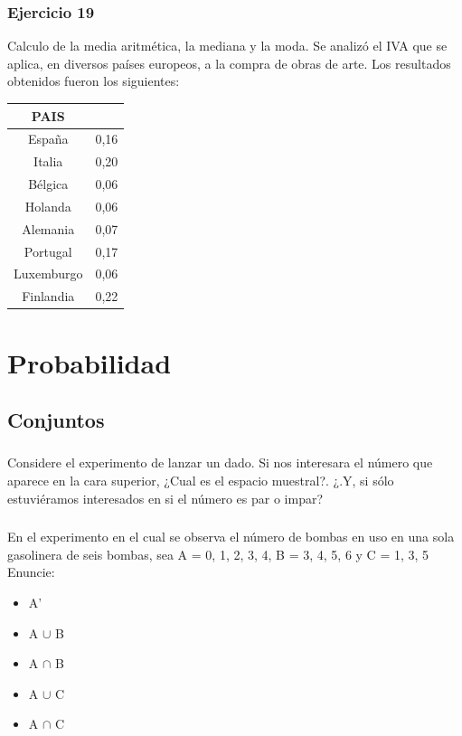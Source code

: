 \documentclass[11pt,letterpaper]{report}
\begin{document}
      \subsection*{Ejercicio 19}
        Calculo de la media aritmética, la mediana y la moda. Se analizó el IVA que se aplica, en diversos países europeos, a la compra de obras de arte. Los resultados obtenidos fueron los siguientes:
        \begin{table}[!h]
            \begin{tabular}{|c|c|}
                \hline
                PAIS& \\
                \hline
                España &0,16\\
                Italia &0,20\\
                Bélgica& 0,06\\
                Holanda& 0,06\\
                Alemania& 0,07\\
                Portugal& 0,17\\
                Luxemburgo& 0,06\\
                Finlandia& 0,22\\
                \hline
            \end{tabular}
        \end{table}

  \chapter{Probabilidad}
    \section{Conjuntos}
      \subsection{}
        Considere el experimento de lanzar un dado. Si nos interesara el número que aparece en la cara superior, ¿Cual es el espacio muestral?. ¿.Y, si sólo estuviéramos interesados en si el número es par o impar?
      \subsection{}
        En el experimento en el cual se observa el número de bombas en uso en una sola gasolinera de seis bombas, sea A = {0, 1, 2, 3, 4}, B = {3, 4, 5, 6} y C = {1, 3, 5}
        Enuncie:
        \begin{itemize}
            \item A'
            \item A $\cup$ B
            \item A $\cap$ B
            \item A $\cup$ C
            \item A $\cap$ C
        \end{itemize}
\end{document}
